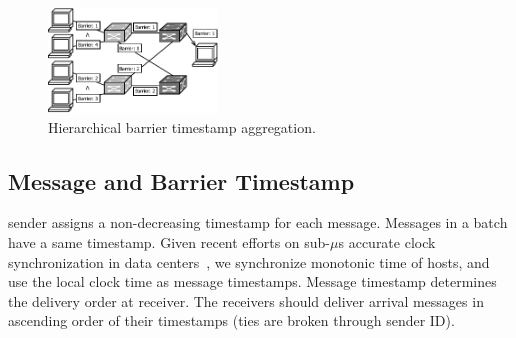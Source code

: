 




\begin{figure}[t]
	\centering
	\includegraphics[width=0.4\textwidth]{images/hierarchical_merge.pdf}
	\caption{Hierarchical barrier timestamp aggregation.} %
	\label{fig:hierarchical_merge}
\end{figure}


\subsection{Message and Barrier Timestamp}
\label{sec:loss-free}

\sys sender assigns a non-decreasing timestamp for each message. Messages in a batch have a same timestamp.
Given recent efforts on sub-$\mu$s accurate clock synchronization in data centers~\cite{correll2005design,lee2016globally,geng2018exploiting}, we synchronize monotonic time of hosts, and use the local clock time as message timestamps.
Message timestamp determines the delivery order at receiver.
The receivers should deliver arrival messages in ascending order of their timestamps (ties are broken through sender ID).


